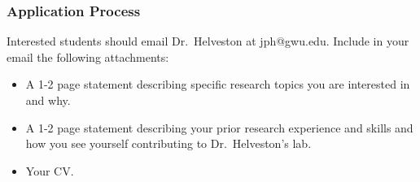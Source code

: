 \documentclass[
  12pt,
  letterpaper,
  DIV=11,
  numbers=noendperiod]{scrartcl}
\providecommand{\tightlist}{%
  \setlength{\itemsep}{0pt}\setlength{\parskip}{0pt}}
\begin{document}
\subsubsection{Application Process}\label{application-process}

Interested students should email Dr.~Helveston at jph@gwu.edu. Include
in your email the following attachments:

\begin{itemize}
\tightlist
\item
  A 1-2 page statement describing specific research topics you are
  interested in and why.
\item
  A 1-2 page statement describing your prior research experience and
  skills and how you see yourself contributing to Dr.~Helveston's lab.
\item
  Your CV.
\end{itemize}
\end{document}
